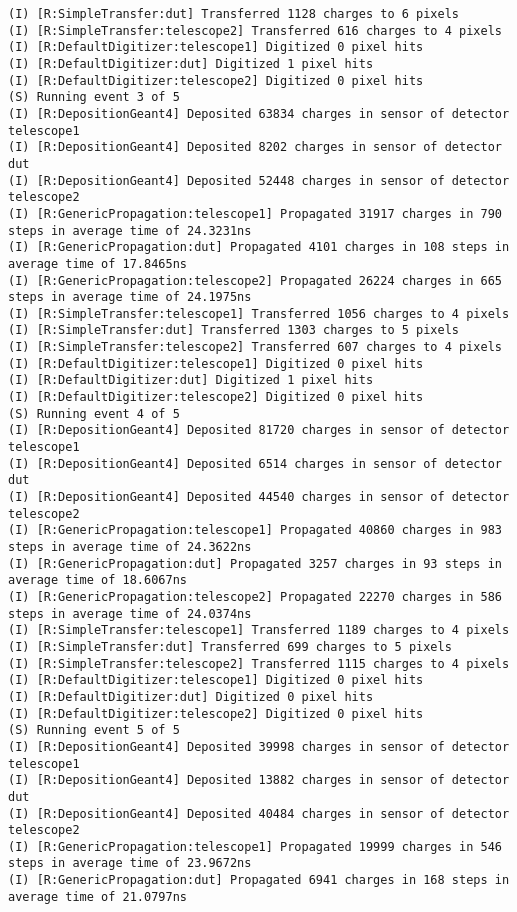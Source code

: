 \begin{lstlisting}[breaklines]
(I) [R:SimpleTransfer:dut] Transferred 1128 charges to 6 pixels
(I) [R:SimpleTransfer:telescope2] Transferred 616 charges to 4 pixels
(I) [R:DefaultDigitizer:telescope1] Digitized 0 pixel hits
(I) [R:DefaultDigitizer:dut] Digitized 1 pixel hits
(I) [R:DefaultDigitizer:telescope2] Digitized 0 pixel hits
(S) Running event 3 of 5
(I) [R:DepositionGeant4] Deposited 63834 charges in sensor of detector telescope1
(I) [R:DepositionGeant4] Deposited 8202 charges in sensor of detector dut
(I) [R:DepositionGeant4] Deposited 52448 charges in sensor of detector telescope2
(I) [R:GenericPropagation:telescope1] Propagated 31917 charges in 790 steps in average time of 24.3231ns
(I) [R:GenericPropagation:dut] Propagated 4101 charges in 108 steps in average time of 17.8465ns
(I) [R:GenericPropagation:telescope2] Propagated 26224 charges in 665 steps in average time of 24.1975ns
(I) [R:SimpleTransfer:telescope1] Transferred 1056 charges to 4 pixels
(I) [R:SimpleTransfer:dut] Transferred 1303 charges to 5 pixels
(I) [R:SimpleTransfer:telescope2] Transferred 607 charges to 4 pixels
(I) [R:DefaultDigitizer:telescope1] Digitized 0 pixel hits
(I) [R:DefaultDigitizer:dut] Digitized 1 pixel hits
(I) [R:DefaultDigitizer:telescope2] Digitized 0 pixel hits
(S) Running event 4 of 5
(I) [R:DepositionGeant4] Deposited 81720 charges in sensor of detector telescope1
(I) [R:DepositionGeant4] Deposited 6514 charges in sensor of detector dut
(I) [R:DepositionGeant4] Deposited 44540 charges in sensor of detector telescope2
(I) [R:GenericPropagation:telescope1] Propagated 40860 charges in 983 steps in average time of 24.3622ns
(I) [R:GenericPropagation:dut] Propagated 3257 charges in 93 steps in average time of 18.6067ns
(I) [R:GenericPropagation:telescope2] Propagated 22270 charges in 586 steps in average time of 24.0374ns
(I) [R:SimpleTransfer:telescope1] Transferred 1189 charges to 4 pixels
(I) [R:SimpleTransfer:dut] Transferred 699 charges to 5 pixels
(I) [R:SimpleTransfer:telescope2] Transferred 1115 charges to 4 pixels
(I) [R:DefaultDigitizer:telescope1] Digitized 0 pixel hits
(I) [R:DefaultDigitizer:dut] Digitized 0 pixel hits
(I) [R:DefaultDigitizer:telescope2] Digitized 0 pixel hits
(S) Running event 5 of 5
(I) [R:DepositionGeant4] Deposited 39998 charges in sensor of detector telescope1
(I) [R:DepositionGeant4] Deposited 13882 charges in sensor of detector dut
(I) [R:DepositionGeant4] Deposited 40484 charges in sensor of detector telescope2
(I) [R:GenericPropagation:telescope1] Propagated 19999 charges in 546 steps in average time of 23.9672ns
(I) [R:GenericPropagation:dut] Propagated 6941 charges in 168 steps in average time of 21.0797ns

\end{lstlisting}
